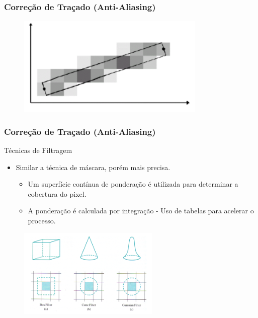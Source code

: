 \documentclass{beamer}
\begin{document}
\begin{frame}
\frametitle{Correção de Traçado (Anti-Aliasing)}
	\begin{figure}[!h]
			\begin{center}
				\includegraphics[width=0.8\textwidth]{Figures/IntSubPixEx}
			\end{center}
		\end{figure}
\end{frame}


\begin{frame}
\frametitle{Correção de Traçado (Anti-Aliasing)}
	\begin{block}{Técnicas de Filtragem}
		\begin{itemize}
			\item Similar a técnica de máscara, porém mais precisa.
				\begin{itemize}
					\item Um superfície contínua de ponderação é utilizada para determinar a cobertura do pixel.
					\item A ponderação é calculada por integração - Uso de tabelas para acelerar o processo.
				\end{itemize}
		\end{itemize}
	\end{block}

	\begin{figure}[!h]
			\begin{center}
				\includegraphics[width=0.6\textwidth]{Figures/Fil}
			\end{center}
		\end{figure}
\end{frame}
\end{document}
